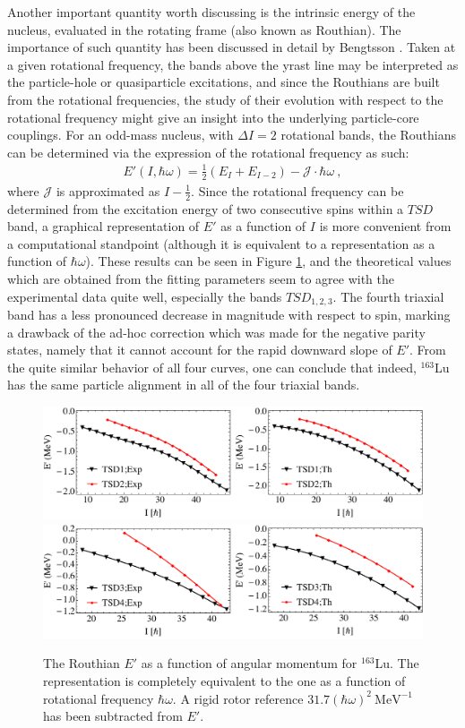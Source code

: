 \documentclass[myclassdoc,debug]{rjparticle}
\begin{document}
Another important quantity worth discussing is the intrinsic energy of the nucleus, evaluated in the rotating frame (also known as Routhian). The importance of such quantity has been discussed in detail by Bengtsson \cite{bengtsson1979quasiparticle}. Taken at a given rotational frequency, the bands above the yrast line may be interpreted as the particle-hole or quasiparticle excitations, and since the Routhians are built from the rotational frequencies, the study of their evolution with respect to the rotational frequency might give an insight into the underlying particle-core couplings. For an odd-mass nucleus, with $\Delta I=2$ rotational bands, the Routhians can be determined via the expression of the rotational frequency as such:
\begin{align}
    E'(I,\hbar\omega)=\frac{1}{2}\left(E_{I}+E_{I-2}\right)-\mathcal{J}\cdot\hbar\omega\ ,
\end{align}
where $\mathcal{J}$ is approximated as $I-\frac{1}{2}$. Since the rotational frequency can be determined from the excitation energy of two consecutive spins within a $TSD$ band, a graphical representation of $E'$ as a function of $I$ is more convenient from a computational standpoint (although it is equivalent to a representation as a function of $\hbar\omega$). These results can be seen in Figure \ref{routhians_plot}, and the theoretical values which are obtained from the fitting parameters seem to agree with the experimental data quite well, especially the bands $TSD_{1,2,3}$. The fourth triaxial band has a less pronounced decrease in magnitude with respect to spin, marking a drawback of the ad-hoc correction which was made for the negative parity states, namely that it cannot account for the rapid downward slope of $E'$. From the quite similar behavior of all four curves, one can conclude that indeed, $^{163}$Lu has the same particle alignment in all of the four triaxial bands.
\begin{figure}
  \centering
  \includegraphics[scale=0.65]{sub-paper1/figs/routhians12.pdf}
 \includegraphics[scale=0.65]{sub-paper1/figs/routhians34.pdf}
\caption{The Routhian $E'$ as a function of angular momentum for $^{163}$Lu. The representation is completely equivalent to the one as a function of rotational frequency $\hbar\omega$. A rigid rotor reference $31.7(\hbar\omega)^2\ \text{MeV}^{-1}$ has been subtracted from $E'$.}
    \label{routhians_plot}
\end{figure}
\end{document}
